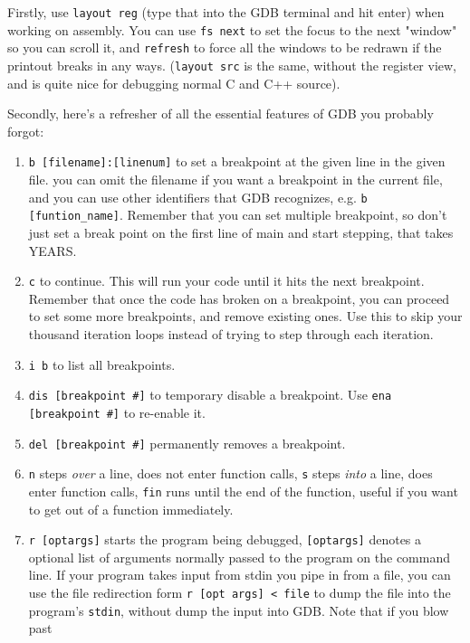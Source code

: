 \documentclass[11pt]{article}
\begin{document}
Firstly, use \texttt{layout reg} (type that into the GDB terminal and hit enter) when
working on assembly. You can use \texttt{fs next} to set the focus to the next "window" so
you can scroll it, and \texttt{refresh} to force all the windows to be redrawn if the
printout breaks in any ways. (\texttt{layout src} is the same, without the register view,
and is quite nice for debugging normal C and C++ source).

Secondly, here's a refresher of all the essential features of GDB you probably forgot:

\begin{enumerate}
    \item \texttt{b [filename]:[linenum]} to set a breakpoint at the given line in the
        given file. you can omit the filename if you want a breakpoint in the current
        file, and you can use other identifiers that GDB recognizes, e.g. \texttt{b
        [funtion\_name]}. Remember that you can set multiple breakpoint, so don't just set
        a break point on the first line of main and start stepping, that takes YEARS.
    \item \texttt{c} to continue. This will run your code until it hits the next
        breakpoint. Remember that once the code has broken on a breakpoint, you can
        proceed to set some more breakpoints, and remove existing ones. Use this to skip
        your thousand iteration loops instead of trying to step through each iteration.
    \item \texttt{i b} to list all breakpoints.
    \item \texttt{dis [breakpoint \#]} to temporary disable a breakpoint. Use \texttt{ena
        [breakpoint \#]} to re-enable it.
    \item \texttt{del [breakpoint \#]} permanently removes a breakpoint.
    \item \texttt{n} steps \emph{over} a line, does not enter function calls, \texttt{s}
        steps \emph{into} a line, does enter function calls, \texttt{fin} runs until the
        end of the function, useful if you want to get out of a function immediately.
    \item \texttt{r [optargs]} starts the program being debugged, \texttt{[optargs]}
        denotes a optional list of arguments normally passed to the program on the command
        line. If your program takes input from stdin you pipe in from a file, you can use
        the file redirection form \texttt{r [opt args] < file} to dump the file into
        the program's \texttt{stdin}, without dump the input into GDB. Note that if you blow past

\end{enumerate}
\end{document}
